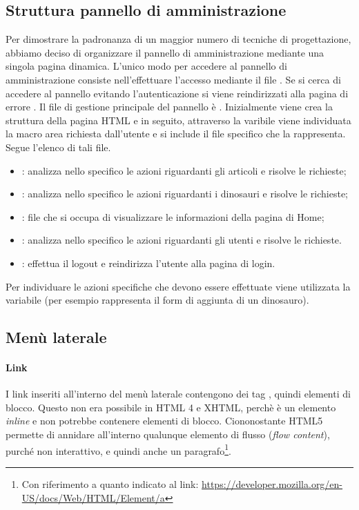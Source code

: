 \documentclass[12pt]{article}
\begin{document}
     \subsection{Struttura pannello di amministrazione}
     Per dimostrare la padronanza di un maggior numero di tecniche di progettazione, abbiamo deciso di organizzare il pannello di amministrazione mediante una singola pagina dinamica. L'unico modo per accedere al pannello di amministrazione consiste nell'effettuare l'accesso mediante il file . Se si cerca di accedere al pannello evitando l'autenticazione si viene reindirizzati alla pagina di errore . Il file di gestione principale del pannello è . Inizialmente viene crea la struttura della pagina HTML e in seguito, attraverso la varibile  viene individuata la macro area richiesta dall'utente e si include il file specifico che la rappresenta. Segue l'elenco di tali file.
      \begin{itemize} 
     	\item {}: analizza nello specifico le azioni riguardanti gli articoli e risolve le richieste;
     	\item {}: analizza nello specifico le azioni riguardanti i dinosauri e risolve le richieste;
     	\item {}: file che si occupa di visualizzare le informazioni della pagina di Home;
     	\item {}: analizza nello specifico le azioni riguardanti gli utenti e risolve le richieste.
     	\item {}: effettua il logout e reindirizza l'utente alla pagina di login.
     \end{itemize}
 	Per individuare le azioni specifiche che devono essere effettuate viene utilizzata la variabile  (per esempio  rappresenta il form di aggiunta di un dinosauro). 
	
	
	\subsection{Menù laterale}
	\paragraph{Link}
	I link inseriti all'interno del menù laterale contengono dei tag , quindi elementi di blocco. Questo non era possibile in HTML 4 e XHTML, perchè  è un elemento \textit{inline} e non potrebbe contenere elementi di blocco. Ciononostante HTML5 permette di annidare all'interno qualunque elemento di flusso (\textit{flow content}), purché non interattivo, e quindi anche un paragrafo\footnote{Con riferimento a quanto indicato al link: \url{https://developer.mozilla.org/en-US/docs/Web/HTML/Element/a}}.
\end{document}
